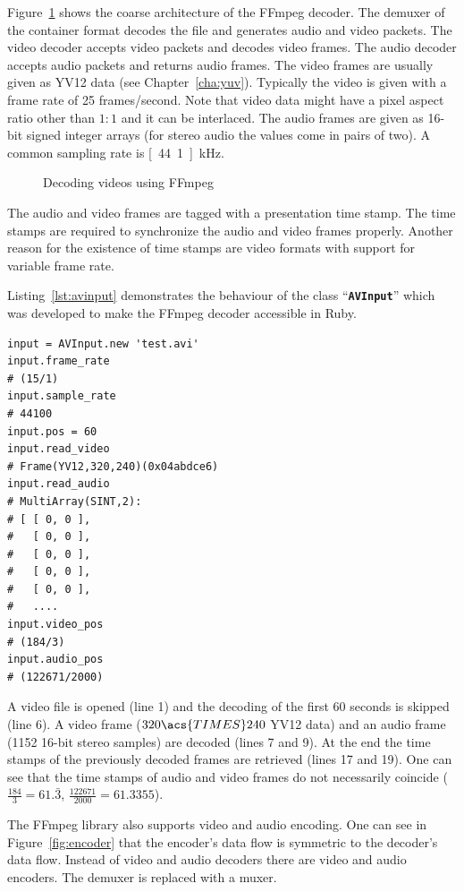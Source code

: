 \documentclass[12pt,a4paper,oneside,openright]{book}
\newcommand{\cha}[1]{Chapter~\ref{cha:#1}}
\newcommand{\fig}[1]{Figure~\ref{fig:#1}}
\newcommand{\lst}[1]{Listing~\ref{lst:#1}}
\newcommand{\code}[1]{``\texttt{\textbf{\textcolor{codegray}{\small{#1}}}}''}
\begin{document}
\begin{CJK}{UTF8}{}
\fig{decoder} shows the coarse architecture of the FFmpeg decoder. The demuxer of the container format decodes the file and generates audio and video packets. The video decoder accepts video packets and decodes video frames. The audio decoder accepts audio packets and returns audio frames. The video frames are usually given as YV12 data (see \cha{yuv}). Typically the video is given with a frame rate of 25 frames/second. Note that video data might have a pixel aspect ratio other than $1:1$ and it can be interlaced. The audio frames are given as 16-bit signed integer arrays (for stereo audio the values come in pairs of two). A common sampling rate is \unit[44.1]{kHz}.
\begin{figure}[htbp]
  \begin{center}
    \caption{Decoding videos using FFmpeg\label{fig:decoder}}
  \end{center}
\end{figure}
The audio and video frames are tagged with a presentation time stamp. The time stamps are required to synchronize the audio and video frames properly. Another reason for the existence of time stamps are video formats with support for variable frame rate.

\lst{avinput} demonstrates the behaviour of the class \code{AVInput} which was developed to make the FFmpeg decoder accessible in Ruby.
\lstset{language=Ruby,frame=single,numbers=left}
\begin{lstlisting}[float,caption={Reading a video file},label=lst:avinput]
input = AVInput.new 'test.avi'
input.frame_rate 
# (15/1)
input.sample_rate 
# 44100
input.pos = 60
input.read_video
# Frame(YV12,320,240)(0x04abdce6)
input.read_audio
# MultiArray(SINT,2):
# [ [ 0, 0 ],
#   [ 0, 0 ],
#   [ 0, 0 ],
#   [ 0, 0 ],
#   [ 0, 0 ],
#   ....
input.video_pos
# (184/3)
input.audio_pos
# (122671/2000)
\end{lstlisting}
A video file is opened (line 1) and the decoding of the first 60 seconds is skipped (line 6). A video frame ($320\acs{TIMES} 240$ YV12 data) and an audio frame (1152 16-bit stereo samples) are decoded (lines 7 and 9). At the end the time stamps of the previously decoded frames are retrieved (lines 17 and 19). One can see that the time stamps of audio and video frames do not necessarily coincide ($\frac{184}{3}=61.\bar{3}$, $\frac{122671}{2000}=61.3355$).

The FFmpeg library also supports video and audio encoding. One can see in \fig{encoder} that the encoder's data flow is symmetric to the decoder's data flow. Instead of video and audio decoders there are video and audio encoders. The demuxer is replaced with a muxer.


\end{CJK}
\end{document}
